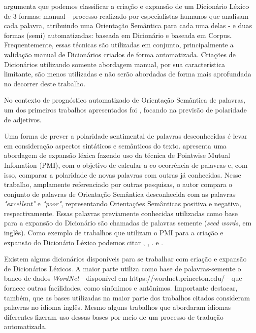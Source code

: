 \documentclass[12pt]{article}
\begin{document}
\cite{kdir16} argumenta que podemos classificar a criação e expansão de um Dicionário Léxico de 3 formas: manual -  processo realizado por especialistas humanos que analisam cada palavra, atribuindo uma Orientação Semântica para cada uma delas -  e duas formas (semi) automatizadas: baseada em Dicionário e baseada em Corpus. Frequentemente, essas técnicas são utilizadas em conjunto, principalmente a validação manual de Dicionários criados de forma automatizada. Criações de Dicionários utilizando somente abordagem manual, por sua característica limitante, são menos utilizadas e não serão abordadas de forma mais aprofundada no decorrer deste trabalho.

No contexto de prognóstico automatizado de Orientação Semântica de palavras, um dos primeiros trabalhos apresentados foi \cite{Hatzivassiloglou}, focando na previsão de polaridade de adjetivos.

Uma forma de prever a polaridade sentimental de palavras desconhecidas é levar em consideração aspectos sintáticos e semânticos do texto. \cite{Turney2002} apresenta uma abordagem de expansão léxica fazendo uso da técnica de Pointwise Mutual Infomation (PMI), com o objetivo de calcular a co-ocorrência de palavras e, com isso, comparar a polaridade de novas palavras com outras já conhecidas. Nesse trabalho, amplamente referenciado por outras pesquisas, o autor compara o conjunto de palavras de Orientação Semântica desconhecida com as palavras \emph{ "excellent"} e \emph{"poor"}, representando Orientações Semânticas positiva e negativa, respectivamente. Essas palavras previamente conhecidas utilizadas como base para a expansão do Dicionário são chamadas de palavras semente (\emph{seed words}, em inglês). Como exemplo de trabalhos que utilizam o PMI para a criação e expansão do Dicionário Léxico podemos citar \cite{becker2013}, \cite{Zhou2014}, \cite{Pinto2007}. \cite{Pantel2006} e \cite{kaji}.

Existem alguns dicionários disponíveis para se trabalhar com criação e expansão de Dicionários Léxicos. A maior parte utiliza como base de palavras-semente o banco de dados \emph{WordNet} - disponível em https://wordnet.princeton.edu/ - que fornece outras facilidades, como sinônimos e antônimos. Importante destacar, também, que as bases utilizadas na maior parte dos trabalhos citados consideram palavras no idioma inglês. Mesmo alguns trabalhos que abordaram idiomas diferentes fizeram uso dessas bases por meio de um processo de tradução automatizada.
\end{document}
